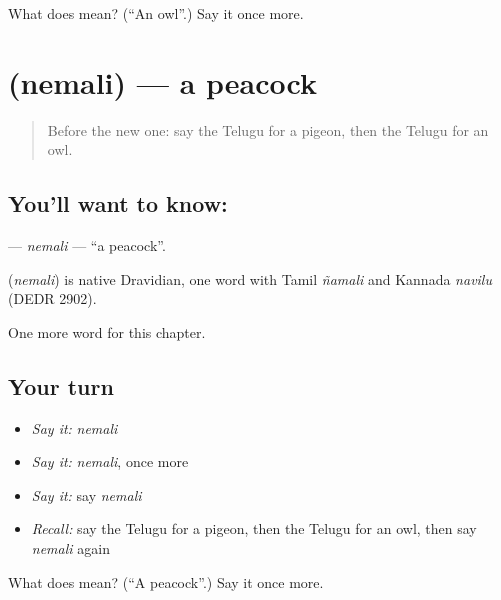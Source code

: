 \begin{tcolorbox}[breakable,colback=teal!4,colframe=teal!35!black,title={Before you move on}]
What does  mean? (\textquotedblleft{}An owl\textquotedblright{}.) Say it once more.
\end{tcolorbox}
\section[\texorpdfstring{\te{నెమలి} (nemali)}{నెమలి (nemali)}]{ (nemali) — a peacock}

\label{lesson:TE-C125-nemali}



\begin{quote}
Before the new one: say the Telugu for a pigeon, then the Telugu for an owl.
\end{quote}

\subsection*{You'll want to know: }
\textbf{} — \emph{nemali} — \textquotedblleft{}a peacock\textquotedblright{}.

\begin{cousinweb}
\textbf{} (\emph{nemali}) is native Dravidian, one word with Tamil \emph{ñamali} and Kannada \emph{navilu} (DEDR 2902).
\end{cousinweb}

\begin{grammarlens}[title={What you've built}]
One more word for this chapter.
\end{grammarlens}

\subsection*{Your turn}
\begin{itemize}
\raggedright
  \item \emph{Say it:} \emph{nemali}
  \item \emph{Say it:} \emph{nemali}, once more
  \item \emph{Say it:} say \emph{nemali}
  \item \emph{Recall:} say the Telugu for a pigeon, then the Telugu for an owl, then say \emph{nemali} again
\end{itemize}

\begin{tcolorbox}[breakable,colback=teal!4,colframe=teal!35!black,title={Before you move on}]
What does  mean? (\textquotedblleft{}A peacock\textquotedblright{}.) Say it once more.
\end{tcolorbox}
